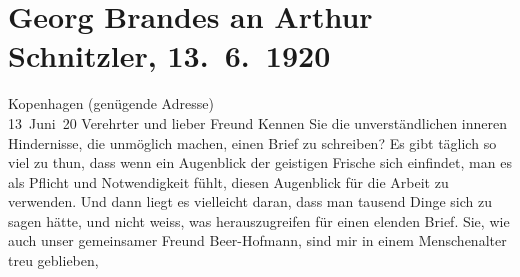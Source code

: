 

         
         \newcommand{\erwaehntePersonen}{Personen: Richard Beer-Hofmann, Gaius Iulius Caesar, Rudolf Jeremias Kreutz, Peter Nansen, Olga Schnitzler, Heinrich Schnitzler, Lili Schnitzler}
         \newcommand{\erwaehnteOrte}{Orte: Budapest, Deutschland, Dänemark, England, Europa, Frankreich, Istanbul, Italien, Kopenhagen, Moskau, Russland, Sankt Petersburg, Skandinavien, Wien, Österreich}
         \newcommand{\erwaehnteWerke}{Werke: Die Schwestern oder Casanova in Spa. Lustspiel in Versen, Die große Phrase, Gaius Julius Cæsar, Jaákobs Traum. Ein Vorspiel, Michelangelo Buonarotti}
               \section[Georg Brandes an Arthur Schnitzler, 13. 6. 1920]{ Georg Brandes an Arthur Schnitzler, 13. 6. 1920}\nopagebreak{}\rehead{ }\begin{ledgroupsized}[t]{13cm}\normalsize\beginnumbering \toendnotes[C]{\smallbreak\pagebreak[2]} 
\toendnotes[C]{\smallbreak}\pstart
           \raggedleft{}{\pb}Kopenhagen (genügende Adresse){\\}13 Juni 20\pend
           \pstart{}Verehrter und lieber Freund \pend\pstart
           Kennen Sie die unverständlichen inneren Hindernisse, die \label{T_L02342_1v}\label{T_L02342_1h} unmöglich machen,
               einen Brief zu schreiben? Es gibt täglich so viel zu thun, dass wenn ein Augenblick
               der geistigen Frische sich einfindet, man es als Pflicht und Notwendigkeit fühlt,
               diesen Augenblick für die Arbeit zu verwenden. Und dann liegt es vielleicht daran,
               dass man tausend Dinge sich zu sagen hätte, und nicht weiss, was herauszugreifen für
               einen elenden Brief. Sie, wie auch unser gemeinsamer Freund Beer-Hofmann, sind mir in einem Menschenalter treu geblieben,

\end{ledgroupsized}
